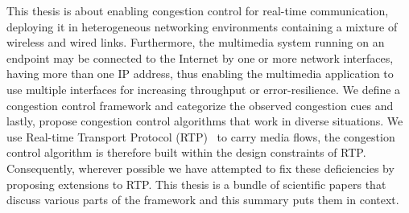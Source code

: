 This thesis is about enabling congestion control for real-time communication,
deploying it in heterogeneous networking environments containing a mixture of
wireless and wired links. Furthermore, the multimedia system running on an
endpoint may be connected to the Internet by one or more network interfaces,
having more than one IP address, thus enabling the multimedia application to
use multiple interfaces for increasing throughput or error-resilience. We
define a congestion control framework and categorize the observed congestion
cues and lastly, propose congestion control algorithms that work in diverse
situations. We use Real-time Transport Protocol (RTP)~\cite{rfc3550} to carry
media flows, the congestion control algorithm is therefore built within the
design constraints of RTP. Consequently, wherever possible we have attempted
to fix these deficiencies by proposing extensions to RTP. This thesis is a
bundle of scientific papers that discuss various parts of the framework and
this summary puts them in context.





